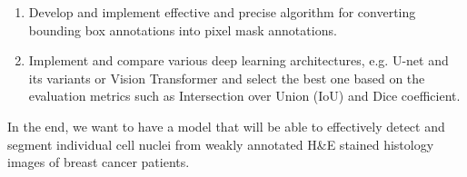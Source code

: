 \begin{enumerate}
    \item Develop and implement effective and precise algorithm for converting bounding box annotations into pixel mask annotations.
    \item Implement and compare various deep learning architectures, e.g. U-net and its variants or Vision Transformer and select the best one based on the evaluation metrics such as Intersection over Union (IoU) and Dice coefficient.
\end{enumerate}

In the end, we want to have a model that will be able to effectively detect and segment individual cell nuclei from weakly annotated H\&E stained histology images of breast cancer patients.

